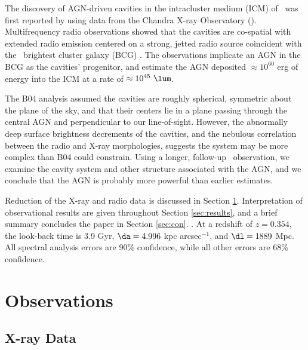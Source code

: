 \documentclass[11pt, preprint]{aastex}
\begin{document}
The discovery of AGN-driven cavities in the intracluster medium (ICM)
of \rbs\ was first reported by \citet{schindler01} using data from the
Chandra X-ray Observatory (\cxo). Multifrequency radio observations
showed that the cavities are co-spatial with extended radio emission
centered on a strong, jetted radio source coincident with the
\rbs\ brightest cluster galaxy (BCG) \citep{2002astro.ph..1349D,
  gitti06, birzan08}. The observations implicate an AGN in the BCG as
the cavities' progenitor, and \citet[][hereafter B04]{birzan04}
estimate the AGN deposited $\approx 10^{60}$ erg of energy into the
ICM at a rate of $\approx 10^{45} ~\lum$.

The B04 analysis assumed the cavities are roughly spherical, symmetric
about the plane of the sky, and that their centers lie in a plane
passing through the central AGN and perpendicular to our
line-of-sight. However, the abnormally deep surface brightness
decrements of the cavities, and the nebulous correlation between the
radio and X-ray morphologies, suggests the system may be more complex
than B04 could constrain. Using a longer, follow-up \cxo\ observation,
we examine the cavity system and other structure associated with the
AGN, and we conclude that the AGN is probably more powerful than
earlier estimates.

Reduction of the X-ray and radio data is discussed in Section
\ref{sec:obs}. Interpretation of observational results are given
throughout Section \ref{sec:results}, and a brief summary concludes
the paper in Section \ref{sec:con}. \LCDM. At a redshift of $z =
0.354$, the look-back time is 3.9 Gyr, $\da = 4.996$ kpc
arcsec$^{-1}$, and $\dl = 1889$ Mpc. All spectral analysis errors are
90\% confidence, while all other errors are 68\% confidence.

\section{Observations}
\label{sec:obs}

\subsection{X-ray Data}
\label{sec:xray}
\end{document}
